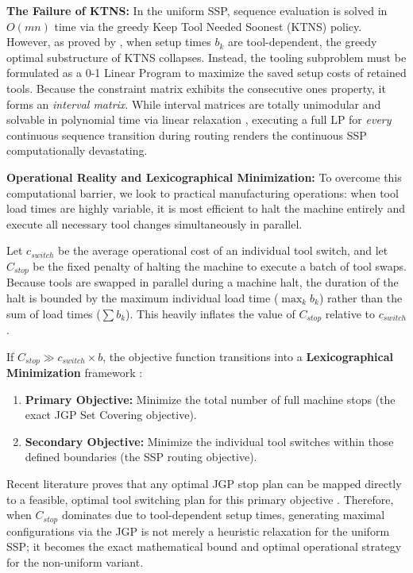 \documentclass[12pt]{article}
\begin{document}
\textbf{The Failure of KTNS:}
In the uniform SSP, sequence evaluation is solved in $O(mn)$ time via the greedy Keep Tool Needed Soonest (KTNS) policy. However, as proved by \cite{Crama1994}, when setup times $b_k$ are tool-dependent, the greedy optimal substructure of KTNS collapses. Instead, the tooling subproblem must be formulated as a 0-1 Linear Program to maximize the saved setup costs of retained tools. Because the constraint matrix exhibits the consecutive ones property, it forms an \textit{interval matrix}. While interval matrices are totally unimodular and solvable in polynomial time via linear relaxation \cite{Crama1994}, executing a full LP for \textit{every} continuous sequence transition during routing renders the continuous SSP computationally devastating.

\textbf{Operational Reality and Lexicographical Minimization:}
To overcome this computational barrier, we look to practical manufacturing operations: when tool load times are highly variable, it is most efficient to halt the machine entirely and execute all necessary tool changes simultaneously in parallel. 

Let $c_{switch}$ be the average operational cost of an individual tool switch, and let $C_{stop}$ be the fixed penalty of halting the machine to execute a batch of tool swaps. Because tools are swapped in parallel during a machine halt, the duration of the halt is bounded by the maximum individual load time ($\max_k b_k$) rather than the sum of load times ($\sum b_k$). This heavily inflates the value of $C_{stop}$ relative to $c_{switch}$. 

If $C_{stop} \gg c_{switch} \times b$, the objective function transitions into a \textbf{Lexicographical Minimization} framework \cite{Adjiashvili2015}:
\begin{enumerate}[noitemsep]
	\item \textbf{Primary Objective:} Minimize the total number of full machine stops (the exact JGP Set Covering objective).
	\item \textbf{Secondary Objective:} Minimize the individual tool switches within those defined boundaries (the SSP routing objective).
\end{enumerate}

Recent literature proves that any optimal JGP stop plan can be mapped directly to a feasible, optimal tool switching plan for this primary objective \cite{Adjiashvili2015}. Therefore, when $C_{stop}$ dominates due to tool-dependent setup times, generating maximal configurations via the JGP is not merely a heuristic relaxation for the uniform SSP; it becomes the exact mathematical bound and optimal operational strategy for the non-uniform variant. 
\end{document}
